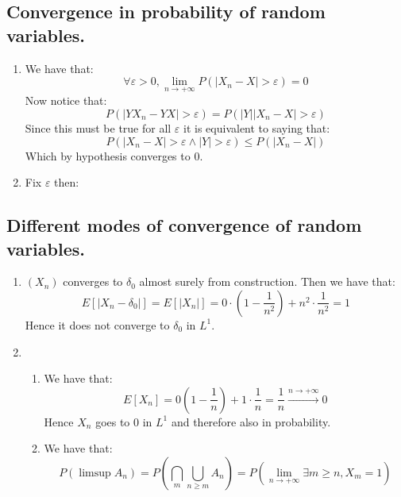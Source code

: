 \documentclass[10pt,a4paper]{book}
\begin{document}
\section{Convergence in probability of random variables.}
\begin{enumerate}

\item We have that:
\[
\forall \varepsilon > 0, \lim_{n \to +\infty} P(|X_n - X| > \varepsilon) = 0
\]
Now notice that:
\[
P(|YX_{n} - YX| > \varepsilon) = P(|Y||X_n - X| > \varepsilon)
\]
Since this must be true for all $\varepsilon$ it is equivalent to saying that:
\[
P(|X_n - X| > \varepsilon \land |Y| > \varepsilon) \leq P(|X_n - X|) 
\]
Which by hypothesis converges to 0.

\item Fix $\varepsilon$ then:

\end{enumerate}

\section{Different modes of convergence of random variables.}
\begin{enumerate}

\item $(X_n)$ converges to $\delta_0$ almost surely from construction. Then we have that:
\[
E[|X_n - \delta_0|] = E[|X_n|] = 0 \cdot (1 - \frac{1}{n^2}) + n^2 \cdot \frac{1}{n^2} = 1
\] 
Hence it does not converge to $\delta_0$ in $L^1$. 

\item 
\begin{enumerate}

\item We have that:
\[
E[X_n] = 0 (1- \frac{1}{n}) + 1 \cdot \frac{1}{n} = \frac{1}{n} \stackrel{n \to +\infty}{\longrightarrow} 0 
\]
Hence $X_n$ goes to $0$ in $L^1$ and therefore also in probability.

\item We have that:
\[
P(\limsup A_n) = P(\bigcap_{m} \bigcup_{n \geq m} A_n) = P(\lim_{n \to +\infty} \exists m \geq n, X_m = 1)
\]


\end{enumerate}

\end{enumerate}

\chapter{}
\end{document}
